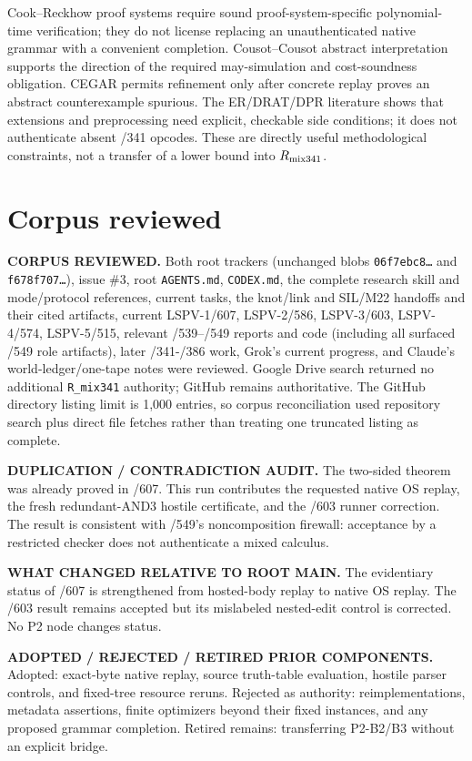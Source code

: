\documentclass[11pt]{article}
\begin{document}
Cook--Reckhow proof systems require sound proof-system-specific polynomial-time
verification; they do not license replacing an unauthenticated native grammar with
a convenient completion.  Cousot--Cousot abstract interpretation supports the
direction of the required may-simulation and cost-soundness obligation.  CEGAR
permits refinement only after concrete replay proves an abstract counterexample
spurious.  The ER/DRAT/DPR literature shows that extensions and preprocessing need
explicit, checkable side conditions; it does not authenticate absent /341 opcodes.
These are directly useful methodological constraints, not a transfer of a lower
bound into $R_{\rm mix341}$.

\section{Corpus reviewed}

\textbf{CORPUS REVIEWED.} Both root trackers (unchanged blobs
\texttt{06f7ebc8\ldots} and \texttt{f678f707\ldots}), issue \#3, root
\texttt{AGENTS.md}, \texttt{CODEX.md}, the complete research skill and mode/protocol
references, current tasks, the knot/link and SIL/M22 handoffs and their cited
artifacts, current LSPV-1/607, LSPV-2/586, LSPV-3/603, LSPV-4/574, LSPV-5/515,
relevant /539--/549 reports and code (including all surfaced /549 role artifacts),
later /341-/386 work, Grok's current progress, and Claude's world-ledger/one-tape
notes were reviewed.  Google Drive search returned no additional
\texttt{R\_mix341} authority; GitHub remains authoritative.  The GitHub directory
listing limit is 1,000 entries, so corpus reconciliation used repository search plus
direct file fetches rather than treating one truncated listing as complete.

\textbf{DUPLICATION / CONTRADICTION AUDIT.} The two-sided theorem was already
proved in /607.  This run contributes the requested native OS replay, the fresh
redundant-AND3 hostile certificate, and the /603 runner correction.  The result is
consistent with /549's noncomposition firewall: acceptance by a restricted checker
does not authenticate a mixed calculus.

\textbf{WHAT CHANGED RELATIVE TO ROOT MAIN.} The evidentiary status of /607 is
strengthened from hosted-body replay to native OS replay.  The /603 result remains
accepted but its mislabeled nested-edit control is corrected.  No P2 node changes
status.

\textbf{ADOPTED / REJECTED / RETIRED PRIOR COMPONENTS.} Adopted: exact-byte native
replay, source truth-table evaluation, hostile parser controls, and fixed-tree
resource reruns.  Rejected as authority: reimplementations, metadata assertions,
finite optimizers beyond their fixed instances, and any proposed grammar completion.
Retired remains: transferring P2-B2/B3 without an explicit bridge.
\end{document}
